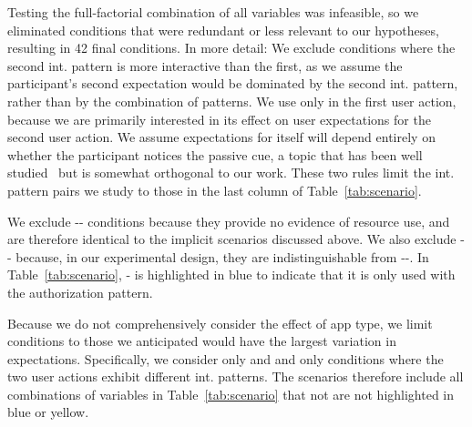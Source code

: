 Testing the full-factorial combination of all variables was
infeasible, so we eliminated conditions that were redundant or less
relevant to our hypotheses, resulting in 42 final
conditions.
%
In more detail:
We exclude conditions where the second int. pattern is more interactive than
the first, as we assume 
the participant's second expectation would be dominated by the second int. pattern, rather than by the  
combination of patterns.
We use \backgroundnotify{} only in the first user action, because we
  are primarily interested in its effect on user 
expectations for the second user action. We assume expectations for \backgroundnotify{} itself will 
depend entirely on whether the participant notices the passive cue, a topic that has been well studied~\cite{Sunshine:2009tn,Schechter:2007bj}
but is somewhat orthogonal to our work. These two rules limit the int. pattern pairs we study to those
in the last column of Table~\ref{tab:scenario}. 

We exclude \never{}-\backgroundonly{}-\backgroundonly{} conditions because they provide no 
evidence of resource use, and are therefore identical to the implicit scenarios discussed above. 
We also exclude \first{}-\backgroundonly{}-\backgroundonly{} because, in our experimental 
design, they are indistinguishable from \launch{}-\backgroundonly{}-\backgroundonly{}. In Table~\ref{tab:scenario}, 
\backgroundonly{}-\backgroundonly{} is highlighted in blue to indicate that it is only used with the 
\launch{} authorization pattern. 

Because we do not comprehensively consider the effect of app type, we limit \fitness{} conditions to those
we anticipated would have the largest variation in expectations. Specifically, we consider only \location{} and \mic{} 
and only conditions where the two user actions exhibit different int. patterns. The \fitness{} scenarios therefore 
include all combinations of variables in Table~\ref{tab:scenario} that
not are not highlighted in blue or yellow.
%
%

